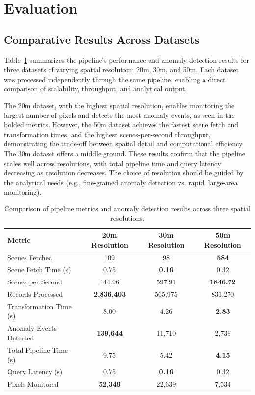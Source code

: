\section{Evaluation}
\label{sec:evaluation}
\subsection{Comparative Results Across Datasets}
\label{sec:comparative_results_datasets}

Table~\ref{tab:three_dataset_comparison} summarizes the pipeline's performance and anomaly detection results for three datasets of varying spatial resolution: 20m, 30m, and 50m. Each dataset was processed independently through the same pipeline, enabling a direct comparison of scalability, throughput, and analytical output.

The 20m dataset, with the highest spatial resolution, enables monitoring the largest number of pixels and detects the most anomaly events, as seen in the bolded metrics. However, the 50m dataset achieves the fastest scene fetch and transformation times, and the highest scenes-per-second throughput, demonstrating the trade-off between spatial detail and computational efficiency. The 30m dataset offers a middle ground. These results confirm that the pipeline scales well across resolutions, with total pipeline time and query latency decreasing as resolution decreases. The choice of resolution should be guided by the analytical needs (e.g., fine-grained anomaly detection vs. rapid, large-area monitoring).

\begin{table}[H]
\centering
\small
\begin{tabular}{|l|c|c|c|}
\hline
\textbf{Metric} & \textbf{20m Resolution} & \textbf{30m Resolution} & \textbf{50m Resolution} \\
\hline
Scenes Fetched & 109 & 98 & \textbf{584} \\
Scene Fetch Time (s) & 0.75 & \textbf{0.16} & 0.32 \\
Scenes per Second & 144.96 & 597.91 & \textbf{1846.72} \\
Records Processed & \textbf{2,836,403} & 565,975 & 831,270 \\
Transformation Time (s) & 8.00 & 4.26 & \textbf{2.83} \\
Anomaly Events Detected & \textbf{139,644} & 11,710 & 2,739 \\
Total Pipeline Time (s) & 9.75 & 5.42 & \textbf{4.15} \\
Query Latency (s) & 0.75 & \textbf{0.16} & 0.32 \\
Pixels Monitored & \textbf{52,349} & 22,639 & 7,534 \\
\hline
\end{tabular}
\caption{Comparison of pipeline metrics and anomaly detection results across three spatial resolutions.}
\label{tab:three_dataset_comparison}
\end{table}


